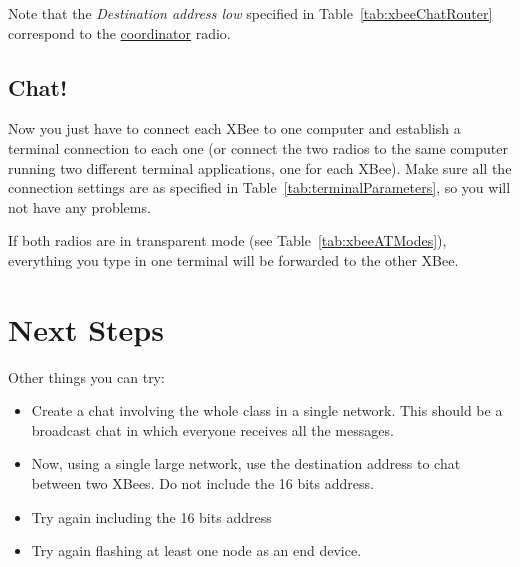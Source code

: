 \begin{table}[htbp]
	\centering
	\caption{XBee router settings for simple chat}
	\label{tab:xbeeChatRouter}
\end{table}

Note that the \emph{Destination address low} specified in Table~\ref{tab:xbeeChatRouter} correspond to the \underline{coordinator} radio.

\subsection{Chat!}
Now you just have to connect each XBee to one computer and establish a terminal connection to each one (or connect the two radios to the same computer running two different terminal applications, one for each XBee). Make sure all the connection settings are as specified in Table~\ref{tab:terminalParameters}, so you will not have any problems.

If both radios are in transparent mode (see Table~\ref{tab:xbeeATModes}), everything you type in one terminal will be forwarded to the other XBee.

\section{Next Steps}

Other things you can try:

\begin{itemize}
\item Create a chat involving the whole class in a single network.
This should be a broadcast chat in which everyone receives all the messages.
\item Now, using a single large network, use the destination address to chat between two XBees.
Do not include the 16 bits address.
\item  Try again including the 16 bits address
\item  Try again flashing at least one node as an end device.
\end{itemize}
